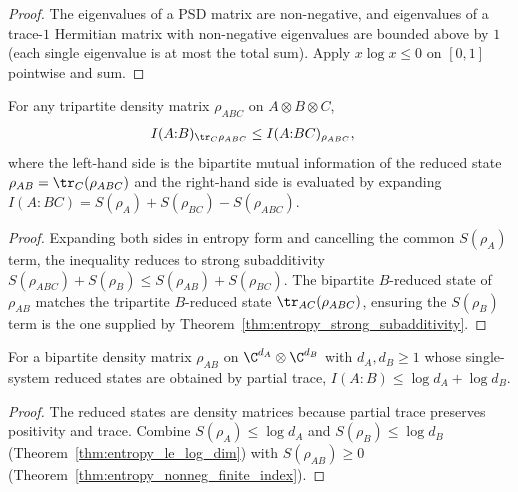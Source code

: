 \begin{proof}\leanok
    The eigenvalues of a PSD matrix are non-negative, and eigenvalues
    of a trace-$1$ Hermitian matrix with non-negative eigenvalues are
    bounded above by $1$ (each single eigenvalue is at most the total
    sum). Apply $x\log x \le 0$ on $[0, 1]$ pointwise and sum.
\end{proof}

\begin{theorem}
    \label{thm:mutual_information_monotone_tripartite}
    \leanok
    For any tripartite density matrix $\rho_{ABC}$ on
    $A \otimes B \otimes C$,
    \begin{align}
        I(A{:}B)_{\tr_C \rho_{ABC}}
        &\le I(A{:}BC)_{\rho_{ABC}},
        \label{eq:entropy_mutual_information_monotone}
    \end{align}
    where the left-hand side is the bipartite mutual information of
    the reduced state $\rho_{AB} = \tr_C(\rho_{ABC})$ and the
    right-hand side is evaluated by expanding
    $I(A{:}BC) = S(\rho_A) + S(\rho_{BC}) - S(\rho_{ABC})$.
\end{theorem}

\begin{proof}\leanok
    Expanding both sides in entropy form and cancelling the common
    $S(\rho_A)$ term, the inequality reduces to strong subadditivity
    $S(\rho_{ABC}) + S(\rho_B) \le S(\rho_{AB}) + S(\rho_{BC})$. The
    bipartite $B$-reduced state of $\rho_{AB}$ matches the tripartite
    $B$-reduced state $\tr_{AC}(\rho_{ABC})$, ensuring the $S(\rho_B)$
    term is the one supplied by Theorem~\ref{thm:entropy_strong_subadditivity}.
\end{proof}

\begin{theorem}
    \label{thm:mutual_information_le_log_dim_add_log_dim}
    \leanok
    For a bipartite density matrix $\rho_{AB}$ on
    $\C^{d_A} \otimes \C^{d_B}$ with $d_A, d_B \ge 1$
    whose single-system reduced states are obtained by partial trace,
    $I(A{:}B) \le \log d_A + \log d_B$.
\end{theorem}

\begin{proof}\leanok
    The reduced states are density matrices because partial trace preserves
    positivity and trace. Combine $S(\rho_A) \le \log d_A$ and
    $S(\rho_B) \le \log d_B$ (Theorem~\ref{thm:entropy_le_log_dim})
    with $S(\rho_{AB}) \ge 0$
    (Theorem~\ref{thm:entropy_nonneg_finite_index}).
\end{proof}
